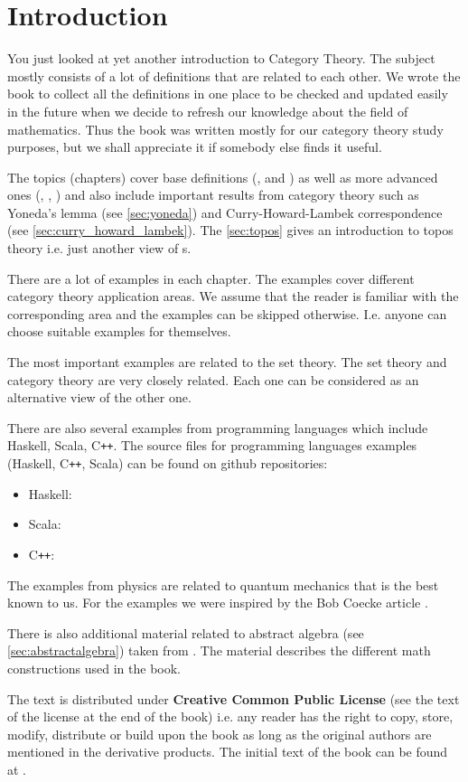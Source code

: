 \chapter*{Introduction}

You just looked at yet another introduction to Category Theory. The
subject mostly consists of a lot of definitions that are related to each
other. We wrote the book to collect all the definitions in one
place to be checked and updated easily in the future when we decide to refresh
our knowledge about the field of mathematics. Thus the book was written mostly
for our category theory study purposes, but we shall appreciate it if
somebody else finds it useful.

The topics (chapters) cover base definitions
(,  and
) as well as more advanced ones (,
, ) and also include important
results from category theory such as Yoneda's lemma (see
\cref{sec:yoneda}) and Curry-Howard-Lambek correspondence (see
\cref{sec:curry_howard_lambek}). The \cref{sec:topos} gives an
introduction to topos theory i.e. just another view of
s.

There are a lot of examples in each chapter. The examples cover
different category 
theory application areas. We assume that the reader is familiar with
the corresponding area and the examples can be skipped otherwise. I.e.
anyone can choose suitable examples for themselves.

The most important examples are related to the set theory. The set
theory and category theory are very closely related. Each one can be
considered as an alternative view of the other one.

There are also several examples from programming languages which include
Haskell, Scala, C\texttt{++}. The source files for programming languages 
examples (Haskell, C\texttt{++}, Scala) can be found on github repositories:
\begin{itemize}
\item Haskell: \cite{github:cattheory_hs_examples}
\item Scala: \cite{github:cattheory_scala_examples}
\item C\texttt{++}: \cite{github:cattheory_cpp_examples}
\end{itemize}

The examples from physics are related to quantum mechanics that is the
best known to us. For the examples we were inspired by the Bob Coecke
article \cite{bib:arxiv:Bob_Coecke_2008}.

There is also additional material related to abstract algebra (see
\cref{sec:abstractalgebra}) taken from
\cite{github:galois_ivanmurashko}. The material describes the
different math constructions used in the book.

The text is distributed under \textbf{Creative Common Public License}
(see the text of the license at the end of the book)
i.e. any reader has the right to copy, store, modify, distribute or build
upon the book as long as the original authors are mentioned in the derivative
products. The initial text of the book can be found at
\cite{github:cattheory_ivanmurashko}.  
